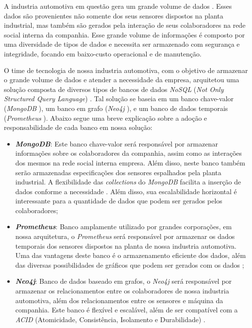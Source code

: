 
A industria automotiva em questão gera um grande volume de dados \cite{marx2013big}. Esses dados são provenientes não somente dos seus sensores dispostos na planta industrial, mas também são gerados pela interação de seus colaboradores na rede social interna da companhia. Esse grande volume de informações é composto por uma diversidade de tipos de dados e necessita ser armazenado com segurança e integridade, focando em baixo-custo operacional e de manutenção.


O time de tecnologia de nossa industria automotiva, com o objetivo de armazenar o grande volume de dados e atender a necessidade da empresa, arquitetou uma solução composta de diversos tipos de bancos de dados \textit{NoSQL} (\textit{Not Only Structured Query Language}) \cite{han2011survey}. Tal solução se baseia em um banco chave-valor (\textit{MongoDB} \cite{chodorow2013mongodb}), um banco em grafo (\textit{Neo4j} \cite{webber2012programmatic}), e um banco de dados temporais (\textit{Prometheus} \cite{turnbull2018monitoring}). Abaixo segue uma breve explicação sobre a adoção e responsabilidade de cada banco em nossa solução:

\begin{itemize}
    \item \textbf{\textit{MongoDB}}: Este banco chave-valor será responsável por armazenar informações sobre os colaboradores da companhia, assim como as interações dos mesmos na rede social interna empresa. Além disso, neste banco também serão armazenadas especificações dos sensores espalhados pela planta industrial. A flexibilidade das \textit{collections} do \textit{MongoDB} facilita a inserção de dados conforme a necessidade \cite{chodorow2013mongodb}. Além disso, sua escalabilidade horizontal é interessante para a quantidade de dados que podem ser gerados pelos colaboradores;
    
    \item \textbf{\textit{Prometheus}}: Banco amplamente utilizado por grandes corporações, em nossa arquitetura, o \textit{Prometheus} será responsável por armazenar os dados temporais dos sensores dispostos na planta de nossa industria automotiva. Uma das vantagens deste banco é o armazenamento eficiente dos dados, além das diversas possibilidades de gráficos que podem ser gerados com os dados \cite{turnbull2018monitoring};
    
    \item \textbf{\textit{Neo4j}}: Banco de dados baseado em grafos, o \textit{Neo4j} será responsável por armazenar os relacionamentos entre os colaboradores de nossa industria automotiva, além dos relacionamentos entre os sensores e máquina da companhia. Este banco é flexível e escalável, além de ser compatível com a \textit{ACID} (Atomicidade, Consistência, Isolamento e Durabilidade) \cite{webber2012programmatic}\cite{date2004introduccao}.
\end{itemize}

